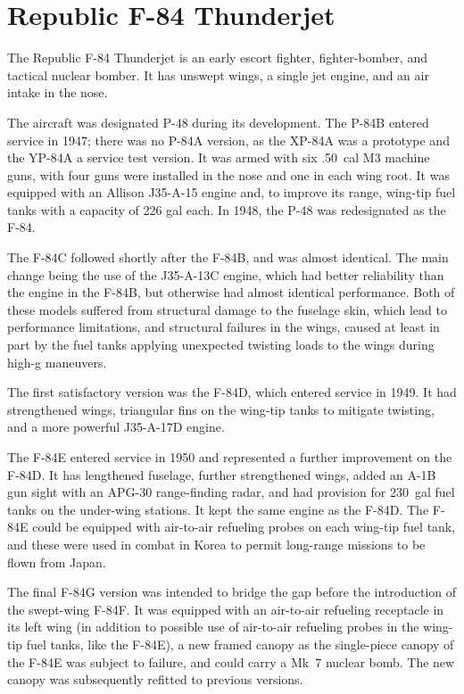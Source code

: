 \section*{Republic F-84 Thunderjet}

The Republic F-84 Thunderjet is an early escort fighter, fighter-bomber, and tactical nuclear bomber. It has unswept wings, a single jet engine, and an air intake in the nose. 

The aircraft was designated P-48 during its development. The P-84B entered service in 1947; there was no P-84A version, as the XP-84A was a prototype and the YP-84A a service test version. It was armed with six .50~cal M3 machine guns, with four guns were installed in the nose and one in each wing root. It was equipped with an Allison J35-A-15 engine and, to improve its range, wing-tip fuel tanks with a capacity of 226 gal each. In 1948, the P-48 was redesignated as the F-84.

The F-84C followed shortly after the F-84B, and was almost identical. The main change being the use of the J35-A-13C engine, which had better reliability than the engine in the F-84B, but otherwise had almost identical performance. Both of these models suffered from structural damage to the fuselage skin, which lead to performance limitations, and structural failures in the wings, caused at least in part by the fuel tanks applying unexpected twisting loads to the wings during high-g maneuvers.

The first satisfactory version was the F-84D, which entered service in 1949. It had strengthened wings, triangular fins on the wing-tip tanks to mitigate twisting, and a more powerful J35-A-17D engine.

The F-84E entered service in 1950 and represented a further improvement on the F-84D. It has lengthened fuselage, further strengthened wings, added an A-1B gun sight with an APG-30 range-finding radar, and had provision for 230~gal fuel tanks on the under-wing stations. It kept the same engine as the F-84D. The F-84E could be equipped with air-to-air refueling probes on each wing-tip fuel tank, and these were used in combat in Korea to permit long-range missions to be flown from Japan.

The final F-84G version was intended to bridge the gap before the introduction of the swept-wing F-84F. It was equipped with an air-to-air refueling receptacle in its left wing (in addition to possible use of air-to-air refueling probes in the wing-tip fuel tanks, like the F-84E), a new framed canopy as the single-piece canopy of the F-84E was subject to failure, and could carry a Mk~7 nuclear bomb. The new canopy was subsequently refitted to previous versions.

